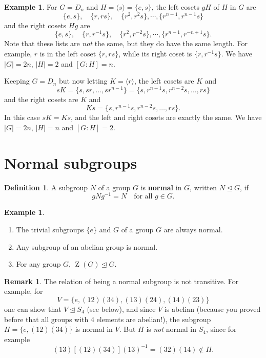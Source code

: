 \documentclass[12pt]{report}
\numberwithin{equation}{section}
\numberwithin{theorem}{chapter}
\theoremstyle{definition}
\newtheorem{definition}[theorem]{Definition}
\newtheorem{example}[theorem]{Example}
\newtheorem*{basic properties}{Basic Properties}
\newtheorem*{Important Remark}{Important Remark}
\newtheorem{remark}[theorem]{Remark}
\def\norm{\mathrel{\unlhd}}
\DeclareMathOperator{\Zc}{Z}
\begin{document}
\begin{example}\label{example cosets D_n}
For $G =D_{n}$ and $H = \langle s \rangle = \{e,s\}$, the left cosets $gH$ of $H$ in $G$ are 
$$
\{e, s\}, \quad  \{r, rs\}, \quad  \{r^2, r^2s\}, \cdots , \{r^{n-1}, r^{n-1}s\}
$$
and the right cosets $Hg$ are
$$
\{e, s\}, \quad \{r, r^{-1}s\}, \quad \{r^2, r^{-2}s\}, \cdots , \{r^{n-1}, r^{-n+1}s\}.
$$
Note that these lists are {\em not} the same, but they do have the same length. For example, $r$ is in the left coset $\{ r, rs \}$, while its right coset is $\{ r, r^{-1}s \}$. 
We have $|G| = 2n$, $|H| = 2$ and $[G:H] = n$.

Keeping $G = D_{n}$ but now letting $K = \langle r \rangle$, the left cosets are $K$ and 
$$
sK = \{s, sr, \dots, sr^{n-1} \} =\{s, r^{n-1}s, r^{n-2}s,\dots, rs \}
$$
and the right cosets are $K$ and 
$$
Ks = \{s, r^{n-1}s, r^{n-2}s,\dots, rs \}.
$$
In this case $sK = Ks$, and the left and right cosets are exactly the same. We have $|G| = 2n$, $|H| = n$ and $[G:H] = 2$.
\end{example}



\section{Normal subgroups}

\begin{definition}\index{$N \norm G$}
A subgroup $N$ of a group $G$ is {\bf normal} in $G$, written $N\norm G$, if $$gNg^{-1} = N \quad \textrm{for all } g \in G.$$
\end{definition}



\begin{example}$\,$
\begin{enumerate}
\item The trivial subgroups $\{e\}$ and $G$ of a group $G$ are always normal.
\item Any subgroup of an abelian group is normal.
\item For any group $G$, $\Zc(G)\norm G$.
\end{enumerate}
\end{example}



\begin{remark}
The relation of being a normal subgroup is not transitive. For example, for 
$$V=\{e, (1 2)(3 4), (1 3)(2 4), (1 4)(2 3)\}$$ 
one can show that $V \norm S_4$ (see  below), and since $V$ is abelian (because you proved before that all groups with 4 elements are abelian!), the subgroup $H = \{e,(12)(34)\}$ is normal in $V$. But $H$ is {\em not} normal in $S_4$, since for example
$$(1 3) [(1 2)(3 4)] (1 3)^{-1} = (3 2)(1 4) \notin H.$$
\end{remark}
\end{document}
